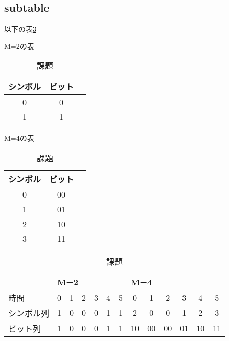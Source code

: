 \documentclass{jsarticle}			%
\begin{document}
		\subsection{subtable}
			以下の表\ref{課題1.2: 課題}
			\begin{table}[H]
				\begin{subtable}{0.49\columnwidth}
					\begin{center}
						\caption[M=2]{M=2の表}
						\label{課題1.2: M=2の表}
						\setlength{\tabcolsep}{3pt}
						\footnotesize
						\begin{tabular}{|c|c|c}
							\hline
							シンボル & ビット \\ \hline \hline
							0 & 0 \\ \hline
							1 & 1 \\ \hline
						\end{tabular}
					\end{center}
				\end{subtable}
				\begin{subtable}{0.49\columnwidth}
					\begin{center}
						\caption[M=4]{M=4の表}
						\label{課題1.2: M=4の表}
						\setlength{\tabcolsep}{3pt}
						\footnotesize
						\begin{tabular}{|c|c|c}
							\hline
							シンボル & ビット \\ \hline \hline
							0 & 00 \\ \hline
							1 & 01 \\ \hline
							2 & 10 \\ \hline
							3 & 11 \\ \hline
						\end{tabular}
					\end{center}
				\end{subtable}
				\begin{subtable}{\columnwidth}
					\begin{center}
						\caption[M]{課題}
						\label{課題1.2: 課題}
						\setlength{\tabcolsep}{3pt}
						\footnotesize
						\begin{tabular}{|l|c|c|c|c|c|c|c|c|c|c|c|c|}
							\hline
							
								& \multicolumn{6}{|l|}{M=2}
								& \multicolumn{6}{|l|}{M=4} \\ \hline
							時間 
								& 0 & 1 & 2 & 3 & 4 & 5
								& 0 & 1 & 2 & 3 & 4 & 5 \\ \hline
							シンボル列
								& 1 & 0 & 0 & 0 & 1 & 1
								& 2 & 0 & 0 & 1 & 2 & 3 \\ \hline
							ビット列
								&  1 &  0 &  0 &  0 &  1 &  1
								& 10 & 00 & 00 & 01 & 10 & 11 \\ \hline
						\end{tabular}
					\end{center}
				\end{subtable}
			\end{table}
\end{document}
